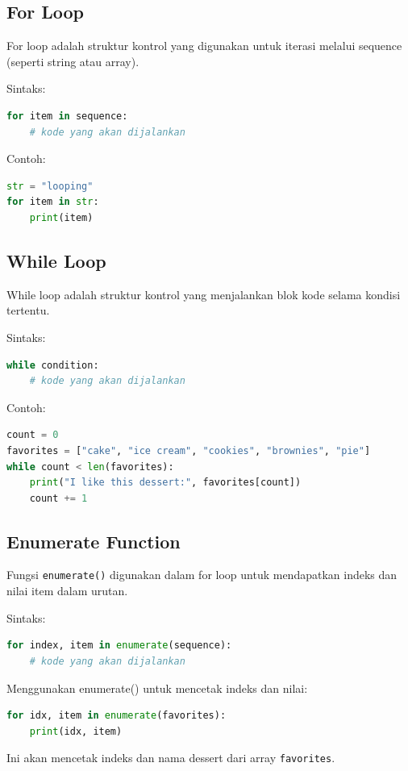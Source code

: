 \documentclass{article}
\begin{document}
\subsection{For Loop}
For loop adalah struktur kontrol yang digunakan untuk iterasi melalui sequence (seperti string atau array).

Sintaks:
\begin{lstlisting}[language=Python, caption={}, captionpos=b]
for item in sequence:
    # kode yang akan dijalankan
\end{lstlisting}
Contoh:
\begin{lstlisting}[language=Python, caption={}, captionpos=b]
str = "looping"
for item in str:
    print(item)
\end{lstlisting}

\subsection{While Loop}
While loop adalah struktur kontrol yang menjalankan blok kode selama kondisi tertentu.

Sintaks:
\begin{lstlisting}[language=Python, caption={}, captionpos=b]
while condition:
    # kode yang akan dijalankan
\end{lstlisting}
Contoh:
\begin{lstlisting}[language=Python, caption={}, captionpos=b]
count = 0
favorites = ["cake", "ice cream", "cookies", "brownies", "pie"]
while count < len(favorites):
    print("I like this dessert:", favorites[count])
    count += 1
\end{lstlisting}

\subsection{Enumerate Function}
Fungsi \verb|enumerate()| digunakan dalam for loop untuk mendapatkan indeks dan nilai item dalam urutan.

Sintaks:
\begin{lstlisting}[language=Python, caption={}, captionpos=b]
for index, item in enumerate(sequence):
    # kode yang akan dijalankan
\end{lstlisting}
Menggunakan enumerate() untuk mencetak indeks dan nilai:
\begin{lstlisting}[language=Python, caption={}, captionpos=b]
for idx, item in enumerate(favorites):
    print(idx, item)
\end{lstlisting}
Ini akan mencetak indeks dan nama dessert dari array \verb|favorites|.
\end{document}
